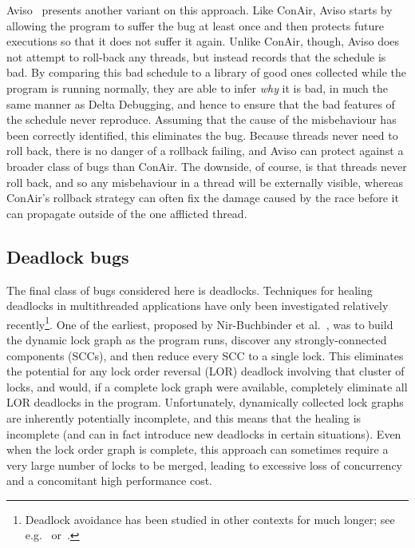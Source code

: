 Aviso~\cite{Lucia2013} presents another variant on this approach.
Like ConAir, Aviso starts by allowing the program to suffer the bug at
least once and then protects future executions so that it does not
suffer it again.  Unlike ConAir, though, Aviso does not attempt to
roll-back any threads, but instead records that the schedule is bad.
By comparing this bad schedule to a library of good ones collected
while the program is running normally, they are able to infer
\emph{why} it is bad, in much the same manner as Delta Debugging, and
hence to ensure that the bad features of the schedule never reproduce.
Assuming that the cause of the misbehaviour has been correctly
identified, this eliminates the bug.  Because threads never need to
roll back, there is no danger of a rollback failing, and Aviso can
protect against a broader class of bugs than ConAir.  The downside, of
course, is that threads never roll back, and so any misbehaviour in a
thread will be externally visible, whereas ConAir's rollback strategy
can often fix the damage caused by the race before it can propagate
outside of the one afflicted thread.

\subsection{Deadlock bugs}
The final class of bugs considered here is deadlocks.  Techniques for
healing deadlocks in multithreaded applications have only been
investigated relatively recently\footnote{Deadlock avoidance has been
  studied in other contexts for much longer; see
  e.g.~\cite{Dijkstra2004} or~\cite{Viswanadham1990}.}\hspace{-1ex}.
One of the earliest, proposed by Nir-Buchbinder et
al.~\cite{Nir-Buchbinder2008}, was to build the dynamic lock graph as
the program runs, discover any strongly-connected components (SCCs),
and then reduce every SCC to a single lock.  This eliminates the
potential for any lock order reversal (LOR) deadlock involving that
cluster of locks, and would, if a complete lock graph were available,
completely eliminate all LOR deadlocks in the program.  Unfortunately,
dynamically collected lock graphs are inherently potentially
incomplete, and this means that the healing is incomplete (and can in
fact introduce new deadlocks in certain situations).  Even when the
lock order graph is complete, this approach can sometimes require a
very large number of locks to be merged, leading to excessive loss of
concurrency and a concomitant high performance cost.

